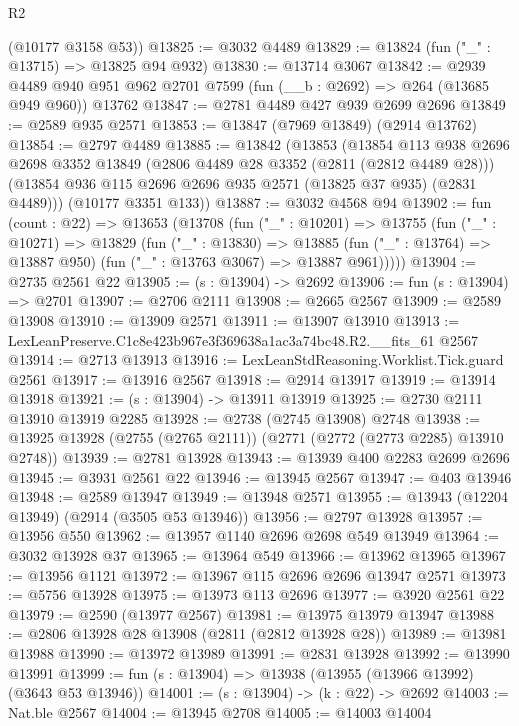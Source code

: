 \begin{lexlean}{R2}
\begin{coremodule}
      (@10177 @3158 @53))
@13825 := @3032 @4489
@13829 := @13824 (fun ("_" : @13715) => @13825 @94 @932)
@13830 := @13714 @3067
@13842 := @2939
    @4489
    @940
    @951
    @962
    @2701
    @7599
    (fun (__b : @2692) => @264 (@13685 @949 @960))
    @13762
@13847 := @2781 @4489 @427 @939 @2699 @2696
@13849 := @2589 @935 @2571
@13853 := @13847 (@7969 @13849) (@2914 @13762)
@13854 := @2797 @4489
@13885 := @13842
    (@13853
      (@13854
        @113
        @938
        @2696
        @2698
        @3352
        @13849
        (@2806 @4489 @28 @3352 (@2811 (@2812 @4489 @28)))
        (@13854 @936 @115 @2696 @2696 @935 @2571 (@13825 @37 @935) (@2831 @4489)))
      (@10177 @3351 @133))
@13887 := @3032 @4568 @94
@13902 := fun (count : @22) =>
  @13653
    (@13708
      (fun ("_" : @10201) =>
      @13755
        (fun ("_" : @10271) =>
        @13829
          (fun ("_" : @13830) =>
          @13885 (fun ("_" : @13764) => @13887 @950) (fun ("_" : @13763 @3067) => @13887 @961)))))
@13904 := @2735 @2561 @22
@13905 := (s : @13904) -> @2692
@13906 := fun (s : @13904) => @2701
@13907 := @2706 @2111
@13908 := @2665 @2567
@13909 := @2589 @13908
@13910 := @13909 @2571
@13911 := @13907 @13910
@13913 := LexLeanPreserve.C1c8e423b967e3f369638a1ac3a74bc48.R2.__fits_61 @2567
@13914 := @2713 @13913
@13916 := LexLeanStdReasoning.Worklist.Tick.guard @2561
@13917 := @13916 @2567
@13918 := @2914 @13917
@13919 := @13914 @13918
@13921 := (s : @13904) -> @13911 @13919
@13925 := @2730 @2111 @13910 @13919 @2285
@13928 := @2738 (@2745 @13908) @2748
@13938 := @13925 @13928 (@2755 (@2765 @2111)) (@2771 (@2772 (@2773 @2285) @13910 @2748))
@13939 := @2781 @13928
@13943 := @13939 @400 @2283 @2699 @2696
@13945 := @3931 @2561 @22
@13946 := @13945 @2567
@13947 := @403 @13946
@13948 := @2589 @13947
@13949 := @13948 @2571
@13955 := @13943 (@12204 @13949) (@2914 (@3505 @53 @13946))
@13956 := @2797 @13928
@13957 := @13956 @550
@13962 := @13957 @1140 @2696 @2698 @549 @13949
@13964 := @3032 @13928 @37
@13965 := @13964 @549
@13966 := @13962 @13965
@13967 := @13956 @1121
@13972 := @13967 @115 @2696 @2696 @13947 @2571
@13973 := @5756 @13928
@13975 := @13973 @113 @2696
@13977 := @3920 @2561 @22
@13979 := @2590 (@13977 @2567)
@13981 := @13975 @13979 @13947
@13988 := @2806 @13928 @28 @13908 (@2811 (@2812 @13928 @28))
@13989 := @13981 @13988
@13990 := @13972 @13989
@13991 := @2831 @13928
@13992 := @13990 @13991
@13999 := fun (s : @13904) => @13938 (@13955 (@13966 @13992) (@3643 @53 @13946))
@14001 := (s : @13904) -> (k : @22) -> @2692
@14003 := Nat.ble @2567
@14004 := @13945 @2708
@14005 := @14003 @14004

\end{coremodule}
\end{lexlean}

